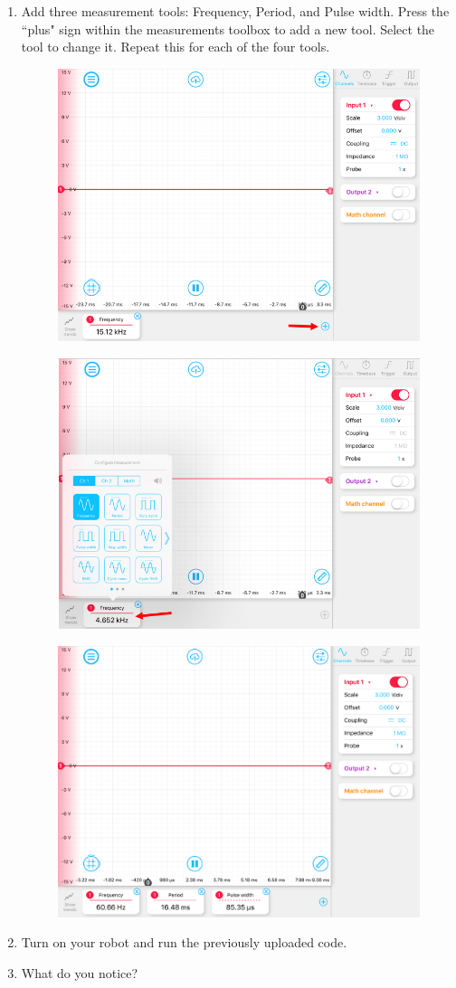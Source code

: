 \documentclass{handout}
\begin{document}
\begin{enumerate}
		\item Add three measurement tools: Frequency, Period, and Pulse width. Press the ``plus" sign within the measurements toolbox to add a new tool. Select the tool to change it. Repeat this for each of the four tools.
		\begin{figure} [H]
			\centering
			\includegraphics[width=.75\textwidth]{Figure7.PNG}
		\end{figure}
	\begin{figure} [H]
		\centering
		\includegraphics[width=.75\textwidth]{Figure8.PNG}
	\end{figure}
	\begin{figure} [H]
	\centering
	\includegraphics[width=.75\textwidth]{Figure9.PNG}
\end{figure}
\item Turn on your robot and run the previously uploaded code.
\item What do you notice?


\end{enumerate}
\end{document}

